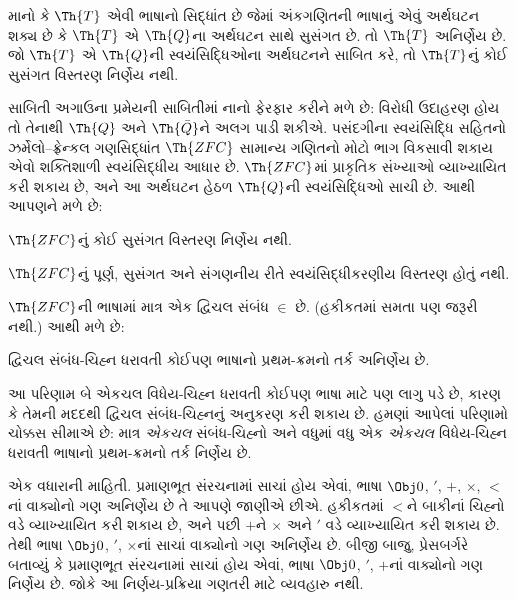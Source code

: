 \begin{thm}
  માનો કે $\Th{T}$ એવી
  ભાષાનો સિદ્ધાંત છે જેમાં
  અંકગણિતની ભાષાનું એવું
  અર્થઘટન શક્ય છે કે
  $\Th{T}$ એ $\Th{Q}$ના
  અર્થઘટન સાથે સુસંગત છે.
  તો $\Th{T}$ અનિર્ણેય છે.
  જો $\Th{T}$ એ
  $\Th{Q}$ની સ્વયંસિદ્ધિઓના
  અર્થઘટનને સાબિત કરે,
  તો $\Th{T}$નું કોઈ
  સુસંગત વિસ્તરણ નિર્ણેય
  નથી.
\end{thm}

સાબિતી અગાઉના પ્રમેયની
સાબિતીમાં નાનો ફેરફાર
કરીને મળે છે: વિરોધી
ઉદાહરણ હોય તો તેનાથી
$\Th{Q}$ અને
$\Th{\bar Q}$ને અલગ
પાડી શકીએ. પસંદગીના
સ્વયંસિદ્ધિ સહિતનો
ઝર્મેલો--ફ્રેન્કલ ગણસિદ્ધાંત
$\Th{ZFC}$ સામાન્ય ગણિતનો
મોટો ભાગ વિકસાવી શકાય
એવો શક્તિશાળી
સ્વયંસિદ્ધીય આધાર છે.
$\Th{ZFC}$માં પ્રાકૃતિક
સંખ્યાઓ વ્યાખ્યાયિત કરી
શકાય છે, અને આ અર્થઘટન
હેઠળ $\Th{Q}$ની
સ્વયંસિદ્ધિઓ સાચી છે.
આથી આપણને મળે છે:

\begin{cor}
$\Th{ZFC}$નું કોઈ
સુસંગત વિસ્તરણ નિર્ણેય નથી.
\end{cor}

\begin{cor}
$\Th{ZFC}$નું પૂર્ણ,
સુસંગત અને સંગણનીય
રીતે સ્વયંસિદ્ધીકરણીય
વિસ્તરણ હોતું નથી.
\end{cor}

$\Th{ZFC}$ની ભાષામાં
માત્ર એક દ્વિચલ સંબંધ
$\in$ છે. (હકીકતમાં
સમતા પણ જરૂરી નથી.)
આથી મળે છે:

\begin{cor}
દ્વિચલ સંબંધ-ચિહ્ન
ધરાવતી કોઈપણ ભાષાનો
પ્રથમ-ક્રમનો તર્ક
અનિર્ણેય છે.
\end{cor}

આ પરિણામ બે એકચલ
વિધેય-ચિહ્ન ધરાવતી કોઈપણ
ભાષા માટે પણ લાગુ પડે છે,
કારણ કે તેમની મદદથી
દ્વિચલ સંબંધ-ચિહ્નનું
અનુકરણ કરી શકાય છે.
હમણાં આપેલાં પરિણામો
ચોક્કસ સીમાએ છે: માત્ર
\emph{એકચલ} સંબંધ-ચિહ્નો
અને વધુમાં વધુ એક
\emph{એકચલ} વિધેય-ચિહ્ન
ધરાવતી ભાષાનો પ્રથમ-ક્રમનો
તર્ક નિર્ણેય છે.

એક વધારાની માહિતી.
પ્રમાણભૂત સંરચનામાં સાચાં
હોય એવાં, ભાષા
$\Obj 0$, $'$, $+$,
$\times$, $<$નાં વાક્યોનો
ગણ અનિર્ણેય છે તે આપણે
જાણીએ છીએ. હકીકતમાં
$<$ને બાકીનાં ચિહ્નો
વડે વ્યાખ્યાયિત કરી
શકાય છે, અને પછી
$+$ને $\times$ અને $'$
વડે વ્યાખ્યાયિત કરી
શકાય છે. તેથી ભાષા
$\Obj 0$, $'$, $\times$નાં
સાચાં વાક્યોનો ગણ
અનિર્ણેય છે. બીજી બાજુ,
પ્રેસબર્ગરે બતાવ્યું કે
પ્રમાણભૂત સંરચનામાં
સાચાં હોય એવાં, ભાષા
$\Obj 0$, $'$, $+$નાં
વાક્યોનો ગણ નિર્ણેય છે.
જોકે આ નિર્ણય-પ્રક્રિયા
ગણતરી માટે વ્યવહારુ નથી.
\endgroup


